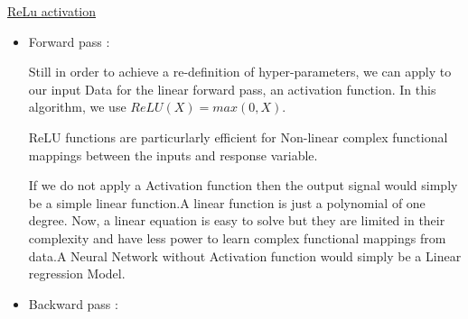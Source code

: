 \underline{ReLu activation}
\begin{itemize}
\item Forward pass :

Still in order to achieve a re-definition of hyper-parameters, we can apply to our input Data for the linear forward pass, an activation function. In this algorithm, we use $ReLU(X) = max(0,X)$.

ReLU functions are particurlarly efficient for Non-linear complex functional mappings between the inputs and response variable.

If we do not apply a Activation function then the output signal would simply be a simple linear function.A linear function is just a polynomial of one degree. Now, a linear equation is easy to solve but they are limited in their complexity and have less power to learn complex functional mappings from data.A Neural Network without Activation function would simply be a Linear regression Model.

\item Backward pass :
\end{itemize}
